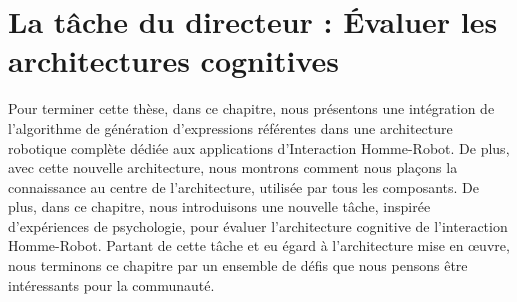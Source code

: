 \section*{La tâche du directeur : Évaluer les architectures cognitives}

Pour terminer cette thèse, dans ce chapitre, nous présentons une intégration de l'algorithme de génération d'expressions référentes dans une architecture robotique complète dédiée aux applications d'Interaction Homme-Robot. De plus, avec cette nouvelle architecture, nous montrons comment nous plaçons la connaissance au centre de l'architecture, utilisée par tous les composants. De plus, dans ce chapitre, nous introduisons une nouvelle tâche, inspirée d'expériences de psychologie, pour évaluer l'architecture cognitive de l'interaction Homme-Robot. Partant de cette tâche et eu égard à l'architecture mise en œuvre, nous terminons ce chapitre par un ensemble de défis que nous pensons être intéressants pour la communauté. 